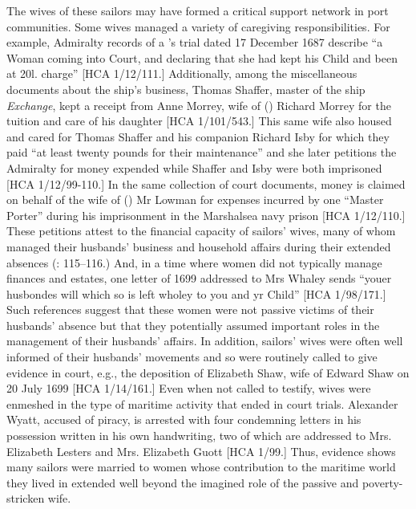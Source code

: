 The wives of these sailors may have formed a critical support network in port communities. Some wives managed a variety of caregiving responsibilities. For example, Admiralty records of a ’s trial dated 17 December {1687} describe “a Woman coming into Court, and declaring that she had kept his Child and been at 20l. charge” [HCA 1/12/111.] Additionally, among the miscellaneous documents about the ship’s business, Thomas Shaffer, master of the ship \textit{Exchange}, kept a receipt from Anne Morrey, wife of () Richard Morrey for the tuition and care of his daughter [HCA 1/101/543.] This same wife also housed and cared for Thomas Shaffer and his companion Richard Isby for which they paid “at least twenty pounds for their maintenance” and she later petitions the Admiralty for money expended while Shaffer and Isby were both imprisoned [HCA 1/12/99-110.] In the same collection of court documents, money is claimed on behalf of the wife of () Mr Lowman for expenses incurred by one “Master Porter” during his imprisonment in the Marshalsea navy prison [HCA 1/12/110.]  These petitions attest to the financial capacity of sailors’ wives, many of whom managed their husbands’ business and household affairs during their extended absences (\citealt{Jarvis2010}: 115--116.) And, in a time where women did not typically manage finances and estates, one letter of 1699 addressed to Mrs Whaley sends “youer husbondes will which so is left wholey to you and yr Child” [HCA 1/98/171.] Such references suggest that these women were not passive victims of their husbands’ absence but that they potentially assumed important roles in the management of their husbands’ affairs. In addition, sailors’ wives were often well informed of their husbands’ movements and so were routinely called to give evidence in court, e.g., the deposition of Elizabeth Shaw, wife of  Edward Shaw on 20 July {1699} [HCA 1/14/161.] Even when not called to testify, wives were enmeshed in the type of maritime activity that ended in court trials. Alexander Wyatt, accused of piracy, is arrested with four condemning letters in his possession written in his own handwriting, two of which are addressed to Mrs. Elizabeth Lesters and Mrs. Elizabeth Guott [HCA 1/99.] Thus, evidence shows many sailors were married to women whose contribution to the maritime world they lived in extended well beyond the imagined role of the passive and poverty-stricken wife. 


